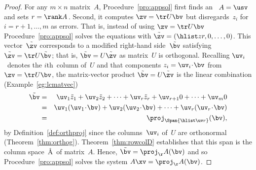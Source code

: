 \begin{proof} 
For any \(m\times n\) matrix~\(A\), Procedure~\ref{pro:appsol} first finds an \svd\ \(A=\usv\) and sets \(r=\rank A\)\,.
Second, it computes \(\zv=\tr U\bv\) but disregards~\(z_i\) for \(i=r+1,\ldots,m\) as errors.
That is, instead of using \(\zv=\tr U\bv\) Procedure~\ref{pro:appsol} solves the equations with \(\tilde\zv=(\hlist zr,0,\ldots,0)\). 
This vector~\(\tilde\zv\) corresponds to a modified right-hand side~\(\tilde\bv\) satisfying \(\tilde\zv=\tr U\tilde\bv\); that is, \(\tilde\bv=U\tilde\zv\) as matrix~\(U\) is orthogonal.
Recalling \(\uv_i\)~denotes the \(i\)th~column of~\(U\) and that components \(z_i=\uv_i\cdot\bv\) from  \(\zv=\tr U\bv\),
the matrix-vector product \(\tilde\bv=U\tilde\zv\) is the linear combination (Example~\ref{eg:lcmatvec})
\begin{eqnarray*}
\tilde\bv&=&\uv_1\tilde z_1+\uv_2\tilde z_2+\cdots+\uv_r\tilde z_r+\uv_{r+1}0+\cdots+\uv_m0
\\&=&\uv_1(\uv_1\cdot\bv)+\uv_2(\uv_2\cdot\bv)+\cdots+\uv_r(\uv_r\cdot\bv)
\\&=&\proj_{\Span\{\hlist\uv r\}}(\bv),
\end{eqnarray*}
by Definition~\ref{def:orthproj} since the columns~\(\uv_i\) of~\(U\) are orthonormal (Theorem~\ref{thm:orthog}).
Theorem~\ref{thm:rowcolD} establishes that this span is the column space~\AA\ of matrix~\(A\).
Hence, \(\tilde\bv=\proj_\AA(\bv)\) and so Procedure~\ref{pro:appsol} solves the system \(A\xv=\proj_\AA(\bv)\).
\end{proof}



